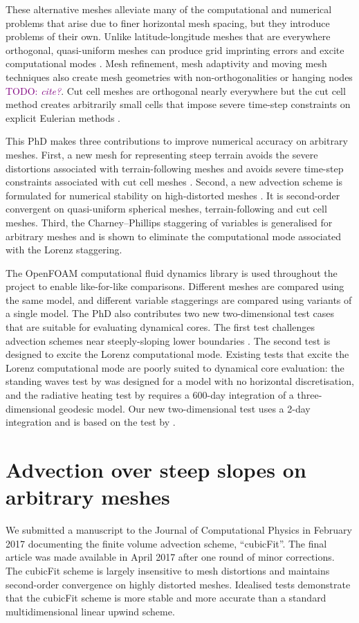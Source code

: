 \documentclass[a4paper,11pt]{article}
\newcommand{\TODO}[1]{\textcolor{purple}{TODO: \emph{#1}}}
\begin{document}
These alternative meshes alleviate many of the computational and numerical problems that arise due to finer horizontal mesh spacing, but they introduce problems of their own.
Unlike latitude-longitude meshes that are everywhere orthogonal, quasi-uniform meshes can produce grid imprinting errors and excite computational modes \citep{weller2012}.
Mesh refinement, mesh adaptivity and moving mesh techniques also create mesh geometries with non-orthogonalities or hanging nodes \TODO{cite?}.
Cut cell meshes are orthogonal nearly everywhere but the cut cell method creates arbitrarily small cells that impose severe time-step constraints on explicit Eulerian methods \citep{klein2009}.

This PhD makes three contributions to improve numerical accuracy on arbitrary meshes.  First, a new mesh for representing steep terrain avoids the severe distortions associated with terrain-following meshes and avoids severe time-step constraints associated with cut cell meshes \citep{shaw-weller2016}.  Second, a new advection scheme is formulated for numerical stability on high-distorted meshes \citep{shaw2017}.  It is second-order convergent on quasi-uniform spherical meshes, terrain-following and cut cell meshes.
Third, the Charney--Phillips staggering of variables is generalised for arbitrary meshes and is shown to eliminate the computational mode associated with the Lorenz staggering.

The OpenFOAM computational fluid dynamics library is used throughout the project to enable like-for-like comparisons.  Different meshes are compared using the same model, and different variable staggerings are compared using variants of a single model.
The PhD also contributes two new two-dimensional test cases that are suitable for evaluating dynamical cores.  The first test challenges advection schemes near steeply-sloping lower boundaries \citep{shaw2017}.
The second test is designed to excite the Lorenz computational mode.  Existing tests that excite the Lorenz computational mode are poorly suited to dynamical core evaluation: the standing waves test by \citet{arakawa-konor1996} was designed for a model with no horizontal discretisation, and the radiative heating test by \cite{untch-hortal2004} requires a 600-day integration of a three-dimensional geodesic model.  Our new two-dimensional test uses a 2-day integration and is based on the test by \citet{arakawa-konor1996}.


\section{Advection over steep slopes on arbitrary meshes}
We submitted a manuscript to the Journal of Computational Physics in February 2017 documenting the finite volume advection scheme, ``cubicFit''.  The final article \citep{shaw2017} was made available in April 2017 after one round of minor corrections.  The cubicFit scheme is largely insensitive to mesh distortions and maintains second-order convergence on highly distorted meshes.  Idealised tests demonstrate that the cubicFit scheme is more stable and more accurate than a standard multidimensional linear upwind scheme.
\end{document}
